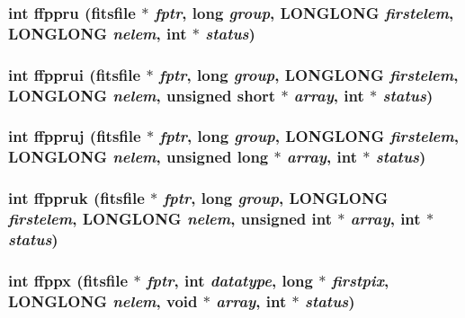\subsubsection{\setlength{\rightskip}{0pt plus 5cm}int ffppru (\bf{fitsfile} $\ast$ {\em fptr}, long {\em group}, \bf{LONGLONG} {\em firstelem}, \bf{LONGLONG} {\em nelem}, int $\ast$ {\em status})}\label{src_2fitsio_8h_02bd28787c00e22132867eab898e1632}


\subsubsection{\setlength{\rightskip}{0pt plus 5cm}int ffpprui (\bf{fitsfile} $\ast$ {\em fptr}, long {\em group}, \bf{LONGLONG} {\em firstelem}, \bf{LONGLONG} {\em nelem}, unsigned short $\ast$ {\em array}, int $\ast$ {\em status})}\label{src_2fitsio_8h_bf984c3beeeb97131a4237a5ff8fb344}


\subsubsection{\setlength{\rightskip}{0pt plus 5cm}int ffppruj (\bf{fitsfile} $\ast$ {\em fptr}, long {\em group}, \bf{LONGLONG} {\em firstelem}, \bf{LONGLONG} {\em nelem}, unsigned long $\ast$ {\em array}, int $\ast$ {\em status})}\label{src_2fitsio_8h_4a659ff524a1a425fda4b2063373f848}


\subsubsection{\setlength{\rightskip}{0pt plus 5cm}int ffppruk (\bf{fitsfile} $\ast$ {\em fptr}, long {\em group}, \bf{LONGLONG} {\em firstelem}, \bf{LONGLONG} {\em nelem}, unsigned int $\ast$ {\em array}, int $\ast$ {\em status})}\label{src_2fitsio_8h_380316a0418b53a2e545f283279a3eff}


\subsubsection{\setlength{\rightskip}{0pt plus 5cm}int ffppx (\bf{fitsfile} $\ast$ {\em fptr}, int {\em datatype}, long $\ast$ {\em firstpix}, \bf{LONGLONG} {\em nelem}, void $\ast$ {\em array}, int $\ast$ {\em status})}\label{src_2fitsio_8h_9a545226811c5df0f85e0bd4c98f0f95}


